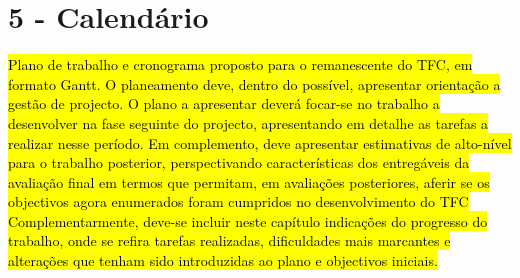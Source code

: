 \chapter*{5 - Calendário}

\hl{Plano de trabalho e cronograma proposto para o remanescente do TFC, em formato Gantt. O planeamento deve, dentro do possível, apresentar orientação a gestão de projecto. 
O plano a apresentar deverá focar-se no trabalho a desenvolver na fase seguinte do projecto, apresentando em detalhe as tarefas a realizar nesse período. Em complemento, deve apresentar estimativas de alto-nível para o trabalho posterior, perspectivando características dos entregáveis da avaliação final em termos que permitam, em avaliações posteriores, aferir se os objectivos agora enumerados foram cumpridos no desenvolvimento do TFC 
Complementarmente, deve-se incluir neste capítulo indicações do progresso do trabalho, onde se refira tarefas realizadas, dificuldades mais marcantes e alterações que tenham sido introduzidas ao plano e objectivos iniciais.}
